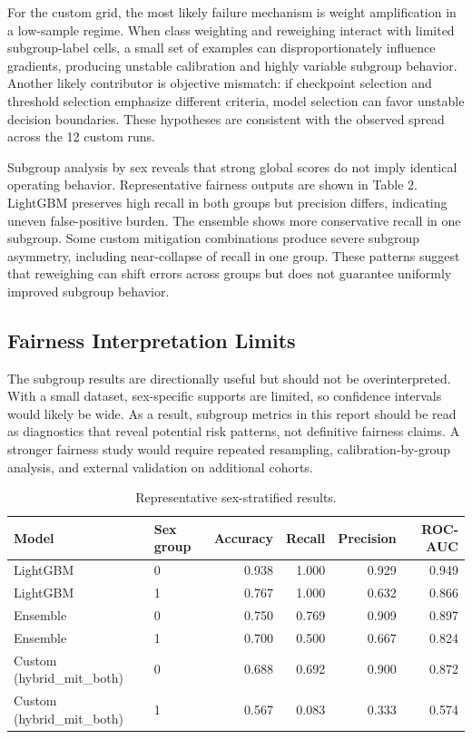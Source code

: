 ﻿\documentclass[11pt]{article}
\begin{document}
For the custom grid, the most likely failure mechanism is weight amplification in a low-sample regime. When class weighting and reweighing interact with limited subgroup-label cells, a small set of examples can disproportionately influence gradients, producing unstable calibration and highly variable subgroup behavior. Another likely contributor is objective mismatch: if checkpoint selection and threshold selection emphasize different criteria, model selection can favor unstable decision boundaries. These hypotheses are consistent with the observed spread across the 12 custom runs.

Subgroup analysis by sex reveals that strong global scores do not imply identical operating behavior. Representative fairness outputs are shown in Table 2. LightGBM preserves high recall in both groups but precision differs, indicating uneven false-positive burden. The ensemble shows more conservative recall in one subgroup. Some custom mitigation combinations produce severe subgroup asymmetry, including near-collapse of recall in one group. These patterns suggest that reweighing can shift errors across groups but does not guarantee uniformly improved subgroup behavior.

\subsection{Fairness Interpretation Limits}
The subgroup results are directionally useful but should not be overinterpreted. With a small dataset, sex-specific supports are limited, so confidence intervals would likely be wide. As a result, subgroup metrics in this report should be read as diagnostics that reveal potential risk patterns, not definitive fairness claims. A stronger fairness study would require repeated resampling, calibration-by-group analysis, and external validation on additional cohorts.

\begin{table}[t]
\centering
\small
\caption{Representative sex-stratified results.}
\begin{tabular}{llrrrr}
\toprule
Model & Sex group & Accuracy & Recall & Precision & ROC-AUC \\
\midrule
LightGBM & 0 & 0.938 & 1.000 & 0.929 & 0.949 \\
LightGBM & 1 & 0.767 & 1.000 & 0.632 & 0.866 \\
Ensemble & 0 & 0.750 & 0.769 & 0.909 & 0.897 \\
Ensemble & 1 & 0.700 & 0.500 & 0.667 & 0.824 \\
Custom (hybrid\_mit\_both) & 0 & 0.688 & 0.692 & 0.900 & 0.872 \\
Custom (hybrid\_mit\_both) & 1 & 0.567 & 0.083 & 0.333 & 0.574 \\
\bottomrule
\end{tabular}
\end{table}
\end{document}
